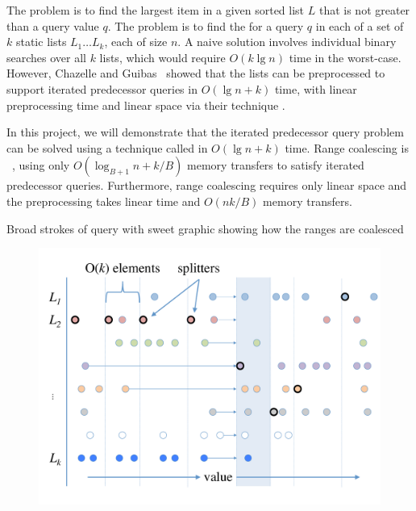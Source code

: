 
The  problem is to find the largest item in a given sorted list $L$
that is not greater than a query value $q$.  The  
problem is to find the  for a query $q$ in each of a set of $k$ static lists
$L_1 \ldots L_k$, each of size $n$.  A naive solution involves individual binary searches over all
$k$ lists, which would require $O(k \lg n)$ time in the worst-case.  However, Chazelle
and Guibas~\cite{ChazelleGu86a} showed that the lists can be 
preprocessed to support iterated predecessor queries in $O(\lg n + k)$ time, with
linear preprocessing time and linear space via their technique .

In this project, we will demonstrate that the iterated predecessor query problem
can be solved using a technique called  in $O(\lg n + k)$ time.
Range coalescing is ~\cite{FrigoLePr99}, using only 
$O(\log_{B+1} n + k/B)$ memory transfers to satisfy iterated predecessor
queries.  Furthermore, range coalescing requires
only linear space and the preprocessing takes linear time and $O(nk/B)$ memory
transfers.

Broad strokes of query with sweet graphic showing how the ranges are coalesced

\begin{figure}[h]
\includegraphics[scale=.3]{cache-oblivious-fractional-cascading-a.pdf}
\caption{}
\label{fig:range_coalescing} 
\end{figure}

